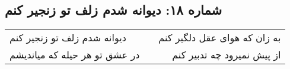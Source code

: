 \begin{center}
\section*{شماره ۱۸: دیوانه شدم زلف تو زنجیر کنم}
\label{sec:018}
\begin{longtable}{l p{0.5cm} r}
دیوانه شدم زلف تو زنجیر کنم
&&
به زان که هوای عقل دلگیر کنم
\\
در عشق تو هر حیله که میاندیشم
&&
از پیش نمیرود چه تدبیر کنم
\\
\end{longtable}
\end{center}
